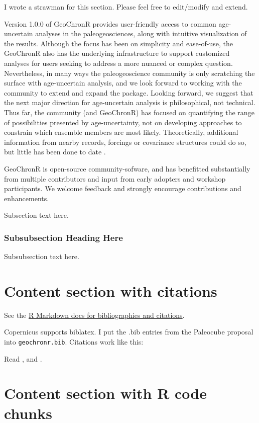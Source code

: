 \documentclass[gc, manuscript]{copernicus}
\begin{document}
I wrote a strawman for this section. Please feel free to edit/modify and extend.

Version 1.0.0 of GeoChronR provides user-friendly access to common age-uncertain analyses in the paleogeosciences, along with intuitive visualization of the results.
Although the focus has been on simplicity and ease-of-use, the GeoChronR also has the underlying infrastructure to support customized analyses for users seeking to address a more nuanced or complex question.
Nevertheless, in many ways the paleogeoscience community is only scratching the surface with age-uncertain analysis, and we look forward to working with the community to extend and expand the package.
Looking forward, we suggest that the next major direction for age-uncertain analysis is philosophical, not technical.
Thus far, the community (and GeoChronR) has focused on quantifying the range of possibilities presented by age-uncertainty, not on developing approaches to constrain which ensemble members are most likely.
Theoretically, additional information from nearby records, forcings or covariance structures could do so, but little has been done to date \citep[ ]{wernerAndTingley}.

GeoChronR is open-source community-sofware, and has benefitted substantially from multiple contributors and input from early adopters and workshop participants.
We welcome feedback and strongly encourage contributions and enhancements.

Subsection text here.

\subsubsection{Subsubsection Heading Here}

Subsubsection text here.

\section{Content section with citations}

See the \href{http://rmarkdown.rstudio.com/authoring_bibliographies_and_citations.html}{R Markdown docs for bibliographies and citations}.

Copernicus supports biblatex. I put the .bib entries from the Paleocube proposal into \texttt{geochronr.bib}. Citations work like this:

Read \citep{Evans_QSR13}, and \citep[see][]{PRYSM}.

\section{Content section with R code chunks}
\end{document}
